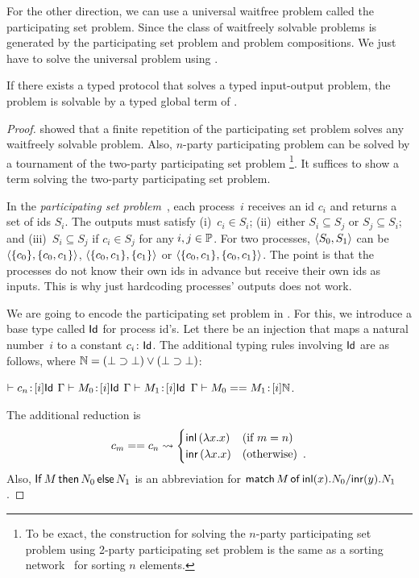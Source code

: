 For the other direction, we can use a universal waitfree problem called
 the participating set problem.
 Since the class of waitfreely solvable problems is generated by the
 participating set problem and problem compositions.
 We just have to solve the universal problem using \lgd.
\begin{theorem}
 \label{th:completeness}
If there exists a typed protocol that solves a typed input-output
problem, the problem is solvable by a typed global term of \lgd.
\end{theorem}

\begin{proof}
\citet{Herlihy99} showed that a finite repetition
 of the participating set
 problem solves any waitfreely solvable problem.
 Also, $n$-party participating problem can be solved by a tournament of
 the two-party participating set problem%
 \footnote{To be exact, the construction for solving the $n$-party
 participating set problem using 2-party participating set problem
 is the same as a sorting network~\citep{batcher1968} for sorting $n$
 elements.}.
 It suffices to show a \lgd\, term solving the two-party participating
 set problem.

In the \textit{participating set problem}~\cite{borowsky},
each process~$i$ receives an id $c_i$ and
returns a set of ids $S_i$.
The outputs must satisfy (i)~$c_i\in S_i$; (ii)~either $S_i\subseteq S_j$
or $S_j\subseteq S_i$; and (iii)~$S_i\subseteq S_j$  if $c_i\in S_j$ for any
$i,j\in\mathbb{P}$.
For two processes,
$\langle{S_0, S_1}\rangle$ can be $\langle{\{c_0\}, \{c_0, c_1\}}\rangle$, $\langle{\{c_0, c_1\}, \{c_1\}}\rangle$
or $\langle{\{c_0, c_1\}, \{c_0, c_1\}}\rangle$.
 The point is that the processes do not know their own ids in advance
 but receive their own ids as inputs.
 This is why just hardcoding processes' outputs does not work.

We are going to encode the participating set problem in \lgd.
For this, we introduce a base type called $\mathsf{Id}$ for process id's.
Let there be an injection that maps a natural number~$i$ to a constant
$c_i\colon\mathsf{Id}$.
The additional typing rules involving $\mathsf{Id}$ are as follows, where $\mathbb{N} = (\bot\supset\bot)\vee(\bot\supset\bot)$:
\begin{center}
 \UnaryRule{}{}
 {$\vdash {c_n} \mathord{\colon\kern -2pt}{[i]\mathsf{Id}}$}
 \hfill
 \BinaryRule
 {$\Gamma\vdash {M_0} \mathord{\colon\kern -2pt}{[}i]\mathsf{Id}$}
 {$\Gamma\vdash {M_1} \mathord{\colon\kern -2pt}{[}i]\mathsf{Id}$}
 {}
 {$\Gamma \vdash {{M_0} == {M_1}} \mathord{\colon\kern -2pt}{[i]\mathbb{N}}$}\enspace.
\end{center}
The additional reduction is
\[
 c_m == c_n \rightsquigarrow
\begin{cases}
 \mathsf{inl}\left({\lambda x.x}\right)& (\text{if } m = n)\\
 \mathsf{inr}\left({\lambda x.x}\right)& (\text{otherwise})\enspace.
\end{cases}
\]
Also,
${\mathsf{If}\, {M}\, \mathsf{then}\, {N_0}\, \mathsf{else}\, {N_1}}$
is an abbreviation for
${\mathsf{match}\,{M}\,\mathsf{of}\, \mathsf{inl}({x}). {N_0}/ \mathsf{inr}({y}). {N_1}}$.


\end{proof}
